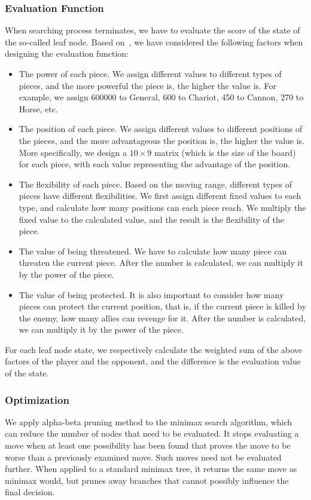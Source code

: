 \subsubsection*{Evaluation Function} When searching process terminates, we have to evaluate the score of the state of the so-called leaf node.
Based on~\cite{yen2004computer}, we have considered the following factors when designing the evaluation function:
\begin{itemize}
    \item The power of each piece.
    We assign different values to different types of pieces, and the more powerful the piece is, the higher the value is.
    For example, we assign 600000 to General, 600 to Chariot, 450 to Cannon, 270 to Horse, etc.
    \item The position of each piece.
    We assign different values to different positions of the pieces, and the more advantageous the position is, the higher the value is.
    More specifically, we design a $10\times 9$ matrix (which is the size of the board) for each piece, with each value
    representing the advantage of the position.
    \item The flexibility of each piece.
    Based on the moving range, different types of pieces have different flexibilities.
    We first assign different fixed values to each type, and calculate how many positions can each piece reach.
    We multiply the fixed value to the calculated value, and the result is the flexibility of the piece.
    \item The value of being threatened.
    We have to calculate how many piece can threaten the current piece.
    After the number is calculated, we can multiply it by the power of the piece.
    \item The value of being protected.
    It is also important to consider how many pieces can protect the current position, that is, if the current piece is killed by the enemy, how many allies can revenge for it.
    After the number is calculated, we can multiply it by the power of the piece.
\end{itemize}
For each leaf node state, we respectively calculate the weighted sum of the above factors of the player and the opponent, and the difference is the evaluation value of the state.

\subsubsection{Optimization}
We apply alpha-beta pruning method to the minimax search algorithm, which can reduce the number of nodes that need to be evaluated.
It stops evaluating a move when at least one possibility has been found that proves the move to be worse than a previously examined move.
Such moves need not be evaluated further.
When applied to a standard minimax tree, it returns the same move as minimax would, but prunes away branches that cannot possibly influence the final decision.